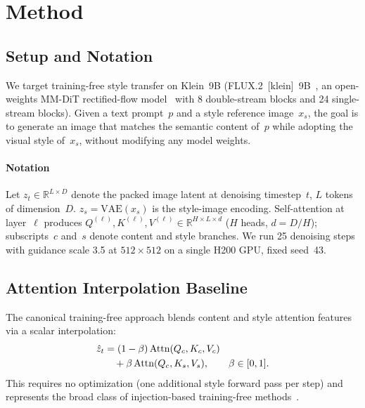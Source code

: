 \section{Method}
\label{sec:method}

\subsection{Setup and Notation}
\label{sec:method:setup}

We target training-free style transfer on Klein~9B
(FLUX.2~[klein]~9B~\cite{flux2klein2025}, an open-weights
MM-DiT rectified-flow model~\cite{esser2024scaling} with 8 double-stream blocks
and 24 single-stream blocks).
Given a text prompt~$p$ and a style reference image~$x_s$, the goal is to
generate an image that matches the semantic content of~$p$ while adopting
the visual style of~$x_s$, without modifying any model weights.

\paragraph{Notation}
Let $z_t \in \mathbb{R}^{L \times D}$ denote the packed image latent at
denoising timestep~$t$, $L$ tokens of dimension~$D$.
$z_s = \text{VAE}(x_s)$ is the style-image encoding.
Self-attention at layer~$\ell$ produces
$Q^{(\ell)}, K^{(\ell)}, V^{(\ell)} \in \mathbb{R}^{H \times L \times d}$
($H$ heads, $d = D/H$); subscripts~$c$ and~$s$ denote content and style
branches.
We run 25 denoising steps with guidance scale 3.5 at $512 \times 512$
on a single H200 GPU, fixed seed~43.

\subsection{Attention Interpolation Baseline}
\label{sec:method:baseline}

The canonical training-free approach blends content and style attention
features via a scalar interpolation:
\begin{align}
  \hat{z}_t &= (1-\beta)\,\text{Attn}(Q_c, K_c, V_c) \notag\\
            &\quad + \beta\,\text{Attn}(Q_c, K_s, V_s),
  \qquad \beta \in [0,1].
  \label{eq:injection}
\end{align}
This requires no optimization (one additional style forward pass per step)
and represents the broad class of injection-based training-free
methods~\cite{hertz2024style,vshuffle2025,dualrf2025}.

